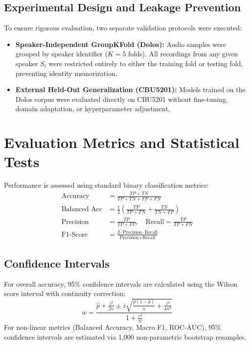\documentclass[conference]{IEEEtran}
\begin{document}
\subsection{Experimental Design and Leakage Prevention}
To ensure rigorous evaluation, two separate validation protocols were executed:
\begin{itemize}
    \item \textbf{Speaker-Independent GroupKFold (Dolos):} Audio samples were grouped by speaker identifier ($K=5$ folds). All recordings from any given speaker $S_i$ were restricted entirely to either the training fold or testing fold, preventing identity memorization.
    \item \textbf{External Held-Out Generalization (CBU5201):} Models trained on the Dolos corpus were evaluated directly on CBU5201 without fine-tuning, domain adaptation, or hyperparameter adjustment.
\end{itemize}

\section{Evaluation Metrics and Statistical Tests}
Performance is assessed using standard binary classification metrics:
\begin{align}
    \text{Accuracy} &= \frac{TP + TN}{TP + TN + FP + FN} \\
    \text{Balanced Acc} &= \frac{1}{2}\left(\frac{TP}{TP + FN} + \frac{TN}{TN + FP}\right) \\
    \text{Precision} &= \frac{TP}{TP + FP}, \quad \text{Recall} = \frac{TP}{TP + FN} \\
    \text{F1-Score} &= \frac{2 \cdot \text{Precision} \cdot \text{Recall}}{\text{Precision} + \text{Recall}}
\end{align}

\subsection{Confidence Intervals}
For overall accuracy, 95\% confidence intervals are calculated using the Wilson score interval \cite{wilson1927probable} with continuity correction:
\begin{equation}
    w = \frac{\hat{p} + \frac{z^2}{2n} \pm z\sqrt{\frac{\hat{p}(1-\hat{p})}{n} + \frac{z^2}{4n^2}}}{1 + \frac{z^2}{n}}
\end{equation}
For non-linear metrics (Balanced Accuracy, Macro F1, ROC-AUC), 95\% confidence intervals are estimated via 1,000 non-parametric bootstrap resamples.
\end{document}
